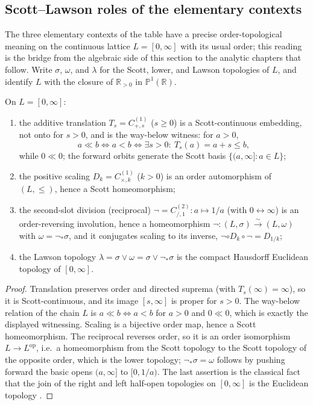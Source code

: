 \subsection{Scott--Lawson roles of the elementary contexts}

The three elementary contexts of the table have a precise order-topological
meaning on the continuous lattice $L=[0,\infty]$ with its usual order; this
reading is the bridge from the algebraic side of this section to the analytic
chapters that follow.  Write $\sigma$, $\omega$, and $\lambda$ for the Scott,
lower, and Lawson topologies of $L$, and identify $L$ with the closure of
$\mathbb R_{>0}$ in $\mathbb P^1(\mathbb R)$.

\begin{proposition}
\label{prop:generator-domain-roles}
On $L=[0,\infty]$:
\begin{enumerate}
  \item the additive translation $T_s=C_{+,s}^{(1)}$ ($s\ge0$) is a
  Scott-continuous embedding, not onto for $s>0$, and is the way-below witness:
  for $a>0$,
  \[
  a\ll b \iff a<b \iff \exists s>0:\ T_s(a)=a+s\le b ,
  \]
  while $0\ll 0$; the forward orbits generate the Scott basis
  $\{(a,\infty]:a\in L\}$;
  \item the positive scaling $D_k=C_{\times,k}^{(1)}$ ($k>0$) is an order
  automorphism of $(L,\le)$, hence a Scott homeomorphism;
  \item the second-slot division (reciprocal) $\neg=C_{/,1}^{(2)}:a\mapsto 1/a$
  (with $0\leftrightarrow\infty$) is an order-reversing involution, hence a
  homeomorphism $\neg:(L,\sigma)\xrightarrow{\sim}(L,\omega)$ with
  $\omega=\neg_*\sigma$, and it conjugates scaling to its inverse,
  $\neg\circ D_k\circ\neg=D_{1/k}$;
  \item the Lawson topology $\lambda=\sigma\vee\omega=\sigma\vee\neg_*\sigma$ is
  the compact Hausdorff Euclidean topology of $[0,\infty]$.
\end{enumerate}
\end{proposition}

\begin{proof}
Translation preserves order and directed suprema (with $T_s(\infty)=\infty$),
so it is Scott-continuous, and its image $[s,\infty]$ is proper for $s>0$.  The
way-below relation of the chain $L$ is $a\ll b\iff a<b$ for $a>0$ and $0\ll0$,
which is exactly the displayed witnessing.  Scaling is a bijective order map,
hence a Scott homeomorphism.  The reciprocal reverses order, so it is an order
isomorphism $L\to L^{\mathrm{op}}$, i.e.\ a homeomorphism from the Scott
topology to the Scott topology of the opposite order, which is the lower
topology; $\neg_*\sigma=\omega$ follows by pushing forward the basic opens
$(a,\infty]$ to $[0,1/a)$.  The last assertion is the classical fact that the
join of the right and left half-open topologies on $[0,\infty]$ is the
Euclidean topology \cite{Warner1990FuzzyTopology,GHKLM2003ContinuousLattices}.
\end{proof}

